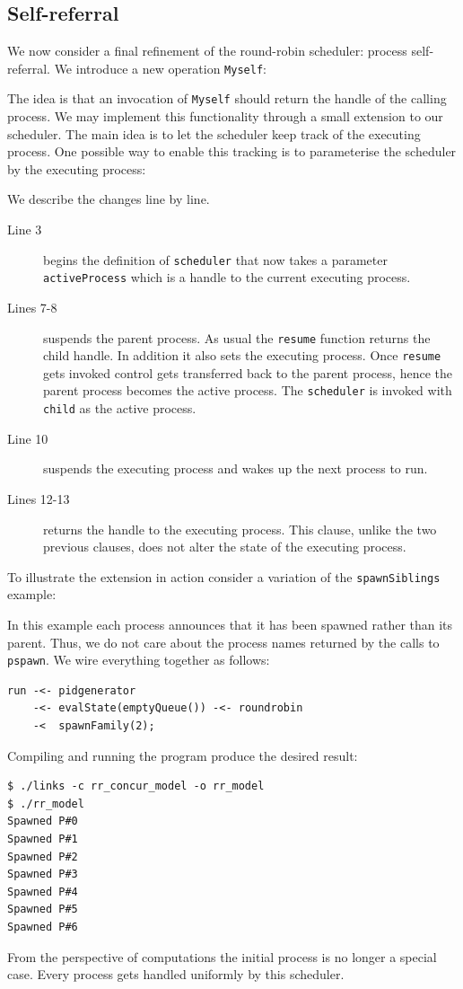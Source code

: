 \documentclass[12pt,mscres,cdtppar,twoside,openright,logo,rightchapter,normalheadings]{infthesis}
\newcommand{\snippet}[1]{}
\theoremstyle{definition}
\begin{document}
\subsection{Self-referral}

We now consider a final refinement of the round-robin scheduler:
process self-referral. We introduce a new operation \lstinline$Myself$:
%
\snippet{myself.links}
%
The idea is that an invocation of \lstinline$Myself$ should return the
handle of the calling process. We may implement this functionality
through a small extension to our scheduler. The main idea is to let
the scheduler keep track of the executing process. One possible way to
enable this tracking is to parameterise the scheduler by the executing
process:
%

%
We describe the changes line by line.
\begin{description}
\item[Line 3] begins the definition of \lstinline$scheduler$ that now
  takes a parameter \lstinline$activeProcess$ which is a handle to the
  current executing process.
\item[Lines 7-8] suspends the parent process. As usual the
  \lstinline$resume$ function returns the child handle. In addition it
  also sets the executing process. Once \lstinline$resume$ gets
  invoked control gets transferred back to the parent process, hence
  the parent process becomes the active process.  The
  \lstinline$scheduler$ is invoked with \lstinline$child$ as the
  active process.
\item[Line 10] suspends the executing process and wakes up the next
  process to run.
\item[Lines 12-13] returns the handle to the executing process. This
  clause, unlike the two previous clauses, does not alter the state of
  the executing process.
\end{description}

To illustrate the extension in action consider a variation of the
\lstinline$spawnSiblings$ example:
%

%
In this example each process announces that it has been spawned rather
than its parent. Thus, we do not care about the process names returned
by the calls to \lstinline$pspawn$. We wire everything together as
follows:
%
\begin{lstlisting}
run -<- pidgenerator 
    -<- evalState(emptyQueue()) -<- roundrobin 
    -<  spawnFamily(2);
\end{lstlisting}
%
Compiling and running the program produce the desired result:
%
\begin{lstlisting}[style=terminal]
$ ./links -c rr_concur_model -o rr_model
$ ./rr_model
Spawned P#0
Spawned P#1
Spawned P#2
Spawned P#3
Spawned P#4
Spawned P#5
Spawned P#6
\end{lstlisting}
%
From the perspective of computations the initial process is no longer
a special case. Every process gets handled uniformly by this
scheduler. 
\end{document}
